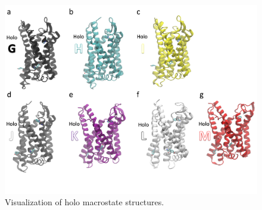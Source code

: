 \begin{figure}[htbp]
\begin{center}
\includegraphics[width=\textwidth]{./figures/holo-centroids.png}
\caption{Visualization of holo macrostate structures.}
\label{fig:holo-centroids}
\end{center}
\end{figure}